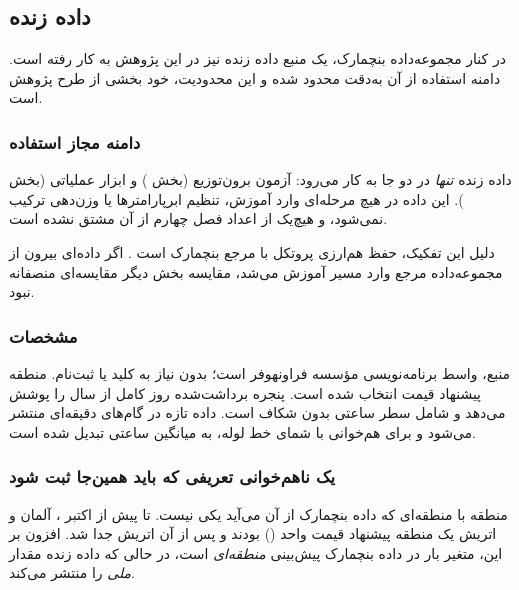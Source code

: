 
\subsection{داده زنده }

در کنار مجموعه‌داده بنچمارک، یک منبع داده زنده نیز در این پژوهش به کار
رفته است. دامنه استفاده از آن به‌دقت محدود شده و این محدودیت، خود بخشی از
طرح پژوهش است.

\subsubsection*{دامنه مجاز استفاده}

داده زنده \emph{تنها} در دو جا به کار می‌رود: آزمون برون‌توزیع
(بخش ) و ابزار عملیاتی  (بخش ). این داده در
هیچ مرحله‌ای وارد آموزش، تنظیم ابرپارامترها یا وزن‌دهی ترکیب نمی‌شود، و
هیچ‌یک از اعداد فصل چهارم از آن مشتق نشده است.

دلیل این تفکیک، حفظ هم‌ارزی پروتکل با مرجع بنچمارک است
\cite{lago_forecasting_2021}. اگر داده‌ای بیرون از مجموعه‌داده مرجع وارد
مسیر آموزش می‌شد، مقایسه بخش  دیگر مقایسه‌ای منصفانه نبود.

\subsubsection*{مشخصات}

منبع، واسط برنامه‌نویسی  مؤسسه فراونهوفر  است؛
بدون نیاز به کلید یا ثبت‌نام. منطقه پیشنهاد قیمت  انتخاب شده
است. پنجره برداشت‌شده  روز کامل از سال  را پوشش می‌دهد و
شامل  سطر ساعتی بدون شکاف است. داده تازه در گام‌های
‌دقیقه‌ای منتشر می‌شود و برای هم‌خوانی با شمای خط لوله، به میانگین
ساعتی تبدیل شده است.

\subsubsection*{یک ناهم‌خوانی تعریفی که باید همین‌جا ثبت شود}

منطقه  با منطقه‌ای که داده بنچمارک از آن می‌آید یکی نیست. تا
پیش از اکتبر ، آلمان و اتریش یک منطقه پیشنهاد قیمت واحد
() بودند و پس از آن اتریش جدا شد. افزون بر این، متغیر بار در
داده بنچمارک پیش‌بینی \emph{منطقه‌ای}  است، در حالی که داده
زنده مقدار \emph{ملی} را منتشر می‌کند.


